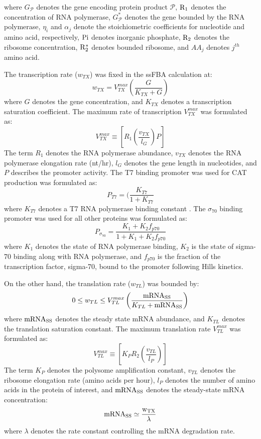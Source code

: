 \documentclass[journal=asbcd6,manuscript=article]{achemso}
\begin{document}
where $G_{\mathcal{P}}$ denotes the gene encoding protein product $\mathcal{P}$,
$\rm R_{1}$ denotes the concentration of RNA polymerase,
$G_{\mathcal{P}}^{*}$ denotes the gene bounded by the RNA polymerase,
$\eta_{i}$ and $ \alpha_{j}$ denote the stoichiometric coefficients for nucleotide and amino acid, respectively,
$\rm Pi$ denotes inorganic phosphate,
$\rm R_{2}$ denotes the ribosome concentration,
$\rm R_{2}^{*}$ denotes bounded ribosome,
and $AA_{j}$ denotes $j^{th}$ amino acid.

The transcription rate ($w_{TX}$) was fixed in the ssFBA calculation at:
\begin{equation}
	w_{TX} = V_{TX}^{max}\left(\frac{G}{K_{TX}+G}\right)
\end{equation}
where $G$ denotes the gene concentration, and $K_{TX}$ denotes a transcription saturation coefficient.
The maximum rate of transcription $V_{TX}^{max}$ was formulated as:
\begin{equation}
	V_{TX}^{max} \equiv \left[R_{1}\left(\frac{v_{TX}}{l_{G}}\right)P\right]
\end{equation}
The term $R_{1}$ denotes the RNA polymerase abundance,
$v_{TX}$ denotes the RNA polymerase elongation rate (nt/hr),
$l_{G}$ denotes the gene length in nucleotides, and $P$ describes the promoter activity.
 The T7 binding promoter was used for CAT production was formulated as:
\begin{equation}
	P_{T7} = (\frac{K_{T7}}{1 + K_{T7}}
\end{equation}
where $K_{T7}$ denotes a T7 RNA polymerase binding constant \cite{Moon:2012aa}.
The $\sigma_{70}$ binding promoter was used for all other proteins was formulated as:
\begin{equation}
	P_{\sigma_{70}} = \frac{K_{1}+K_{2}f_{p70}}{1 + K_{1}+K_{2}f_{p70}}
\end{equation}
where $K_{1}$ denotes the state of RNA polymerase binding, $K_{2}$ is the state of sigma-70 binding along with RNA polymerase, and $f_{p70}$ is the fraction of the transcription factor, sigma-70, bound to the promoter following Hills kinetics. 

On the other hand, the translation rate ($w_{TL}$) was bounded by:
 \begin{equation}
	0\leq w_{TL} \leq V_{TL}^{max}\left(\frac{\rm mRNA_{SS}}{K_{TL}+\rm mRNA_{SS}}\right)
\end{equation}
where $\rm mRNA_{SS}$ denotes the steady state mRNA abundance, and $K_{TL}$ denotes the translation saturation constant.
The maximum translation rate $V_{TL}^{max}$ was formulated as:
\begin{equation}
	V_{TL}^{max} \equiv \left[K_{P} R_{2}\left(\frac{v_{TL}}{l_{P}}\right)\right]
\end{equation}
The term $K_{P}$ denotes the polysome amplification constant,
$v_{TL}$ denotes the ribosome elongation rate (amino acids per hour),
$l_{P}$ denotes the number of amino acids in the protein of interest,
and $\rm mRNA_{SS}$ denotes the steady-state mRNA concentration:
\begin{equation}
	\rm mRNA_{SS}\simeq\frac{w_{TX}}{\lambda}
\end{equation}where $\lambda$ denotes the rate constant controlling the mRNA degradation rate.
\end{document}
